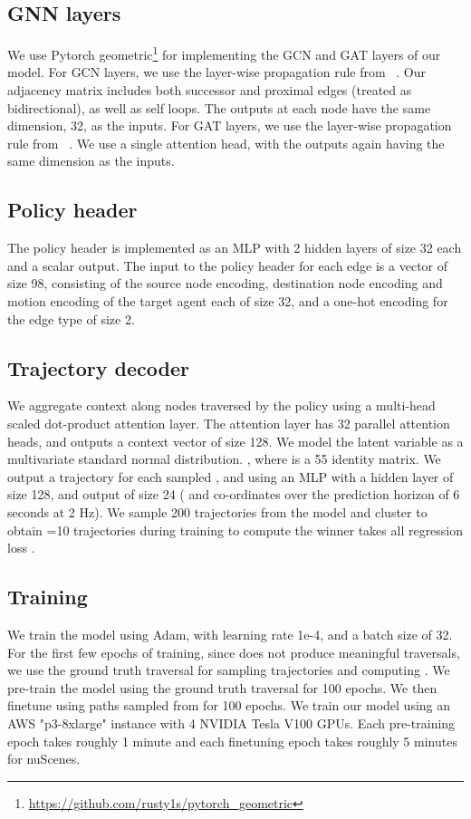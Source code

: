 \documentclass{article}
\begin{document}
\subsection{GNN layers}
We use Pytorch geometric\footnote{\href{https://github.com/rusty1s/pytorch_geometric}{https://github.com/rusty1s/pytorch\_geometric}} for implementing the GCN and GAT layers of our model. For GCN layers, we use the layer-wise propagation rule from ~\citep{kipf2016semi}. Our adjacency matrix includes both successor and proximal edges (treated as bidirectional), as well as self loops. The outputs at each node have the same dimension, 32, as the inputs. For GAT layers, we use the layer-wise propagation rule from ~\citep{velivckovic2017graph}. We use a single attention head, with the outputs again having the same dimension as the inputs.

\subsection{Policy header}
The policy header is implemented as an MLP with 2 hidden layers of size 32 each and a scalar output. The input to the policy header for each edge is a vector of size 98, consisting of the source node encoding, destination node encoding and motion encoding of the target agent each of size 32, and a one-hot encoding for the edge type of size 2.

\subsection{Trajectory decoder}
We aggregate context along nodes traversed by the policy using a multi-head scaled dot-product attention layer. The attention layer has 32 parallel attention heads, and outputs a context vector  of size 128. We model the latent variable as a multivariate standard normal distribution. , where  is a 55 identity matrix. 
We output a trajectory for each sampled ,  and  using an MLP with a hidden layer of size 128, and output of size 24 ( and  co-ordinates over the prediction horizon of 6 seconds at 2 Hz). We sample 200 trajectories from the model and cluster to obtain =10 trajectories during training to compute the winner takes all regression loss .


\subsection{Training}
We train the model using Adam, with learning rate 1e-4, and a batch size of 32. For the first few epochs of training, since  does not produce meaningful traversals, we use the ground truth traversal for sampling trajectories and computing . We pre-train the model using the ground truth traversal for 100 epochs. We then finetune using paths sampled from  for 100 epochs. We train our model using an AWS "p3-8xlarge" instance with 4 NVIDIA Tesla V100 GPUs. Each pre-training epoch takes roughly 1 minute and each finetuning epoch takes roughly 5 minutes for nuScenes.  
\end{document}
